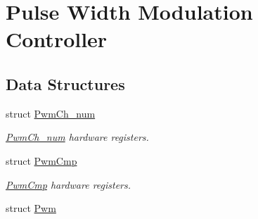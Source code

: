 \hypertarget{group__SAME70__PWM}{}\section{Pulse Width Modulation Controller}
\label{group__SAME70__PWM}
\subsection*{Data Structures}
\begin{DoxyCompactItemize}
\item 
struct \mbox{\hyperlink{structPwmCh__num}{Pwm\+Ch\+\_\+num}}
\begin{DoxyCompactList}\small\item\em \mbox{\hyperlink{structPwmCh__num}{Pwm\+Ch\+\_\+num}} hardware registers. \end{DoxyCompactList}\item 
struct \mbox{\hyperlink{structPwmCmp}{Pwm\+Cmp}}
\begin{DoxyCompactList}\small\item\em \mbox{\hyperlink{structPwmCmp}{Pwm\+Cmp}} hardware registers. \end{DoxyCompactList}\item 
struct \mbox{\hyperlink{structPwm}{Pwm}}
\end{DoxyCompactItemize}
